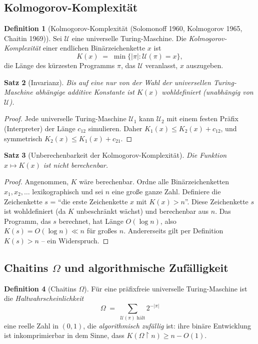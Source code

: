 \documentclass[12pt,a4paper]{amsart}
\newtheorem{theorem}{Satz}[section]
\theoremstyle{definition}
\newtheorem{definition}[theorem]{Definition}
\theoremstyle{remark}
\begin{document}
\subsection{Kolmogorov-Komplexität}

\begin{definition}[Kolmogorov-Komplexität (Solomonoff 1960, Kolmogorov 1965, Chaitin 1969)]
Sei $\mathcal{U}$ eine universelle Turing-Maschine. Die \emph{Kolmogorov-Komplexität}
einer endlichen Binärzeichenkette $x$ ist
\[
  K(x) \;=\; \min\bigl\{|\pi| : \mathcal{U}(\pi) = x\bigr\},
\]
die Länge des kürzesten Programms $\pi$, das $\mathcal{U}$ veranlasst, $x$
auszugeben.
\end{definition}

\begin{theorem}[Invarianz]\label{satz:invarianz}
Bis auf eine nur von der Wahl der universellen Turing-Maschine abhängige additive
Konstante ist $K(x)$ wohldefiniert (unabhängig von $\mathcal{U}$).
\end{theorem}
\begin{proof}
Jede universelle Turing-Maschine $\mathcal{U}_1$ kann $\mathcal{U}_2$ mit einem
festen Präfix (Interpreter) der Länge $c_{12}$ simulieren. Daher
$K_1(x) \leq K_2(x) + c_{12}$, und symmetrisch $K_2(x) \leq K_1(x) + c_{21}$.
\end{proof}

\begin{theorem}[Unberechenbarkeit der Kolmogorov-Komplexität]\label{satz:kolmogorov-unberechenbar}
Die Funktion $x \mapsto K(x)$ ist nicht berechenbar.
\end{theorem}
\begin{proof}
Angenommen, $K$ wäre berechenbar. Ordne alle Binärzeichenketten $x_1, x_2, \ldots$
lexikographisch und sei $n$ eine große ganze Zahl. Definiere die Zeichenkette
$s$ = ``die erste Zeichenkette $x$ mit $K(x) > n$''. Diese Zeichenkette $s$ ist
wohldefiniert (da $K$ unbeschränkt wächst) und berechenbar aus $n$. Das Programm,
das $s$ berechnet, hat Länge $O(\log n)$, also $K(s) = O(\log n) \ll n$ für
großes $n$. Andererseits gilt per Definition $K(s) > n$ -- ein Widerspruch.
\end{proof}

\subsection{Chaitins $\Omega$ und algorithmische Zufälligkeit}

\begin{definition}[Chaitins $\Omega$]
Für eine präfixfreie universelle Turing-Maschine ist die \emph{Haltwahrscheinlichkeit}
\[
  \Omega \;=\; \sum_{\mathcal{U}(\pi)\text{ hält}} 2^{-|\pi|}
\]
eine reelle Zahl in $(0,1)$, die \emph{algorithmisch zufällig} ist: ihre binäre
Entwicklung ist inkomprimierbar in dem Sinne, dass
$K(\Omega \upharpoonright n) \geq n - O(1)$.
\end{definition}
\end{document}

